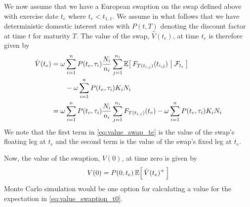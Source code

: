 We now assume that we have a European swaption on the swap defined above with exercise date $t_e$ where $t_e < t_{1,1}$. We assume in what follows that we have deterministic domestic interest rates with $P(t,T)$ denoting the discount factor at time $t$ for maturity $T$. The value of the swap, $\hat{V}(t_e)$, at time $t_e$ is therefore given by
\begin{equation}
\label{eq:value_swap_te}
\begin{split}
\hat{V}(t_e) &= \omega \sum_{i=1}^{n} P(t_e, \tau_i) \frac{N_i}{n_i} \sum_{j=1}^{n_i} \CEx{F_{T(t_{i,j})}(t_{i,j})}{\mathcal{F}_{t_e}} \\
             &\qquad - \omega \sum_{i=1}^{n} P(t_e, \tau_i) K_i N_i \\
             &= \omega \sum_{i=1}^{n} P(t_e, \tau_i) \frac{N_i}{n_i} \sum_{j=1}^{n_i} F_{T(t_{i,j})}(t_e) - \omega \sum_{i=1}^{n} P(t_e, \tau_i) K_i N_i
\end{split}
\end{equation}
We note that the first term in \eqref{eq:value_swap_te} is the value of the swap's floating leg at $t_e$ and the second term is the value of the swap's fixed leg at $t_e$.

Now, the value of the swaption, $V(0)$, at time zero is given by
\begin{equation}
\label{eq:value_swaption_t0}
V(0) = P(0, t_e) \Ex{\hat{V}(t_e)^{+}}
\end{equation}
Monte Carlo simulation would be one option for calculating a value for the expectation in \eqref{eq:value_swaption_t0}.

